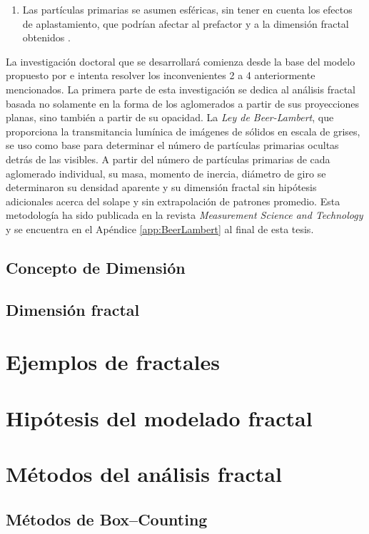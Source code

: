 \begin{enumerate}
	\item Las partículas primarias se asumen esféricas, sin tener en cuenta los efectos de aplastamiento, que podrían afectar al prefactor y a la dimensión fractal obtenidos \cite{ohetal:1997,brasiletal:1999,alzaitoneetal:2009}.
\end{enumerate}

\par La investigación doctoral que se desarrollará comienza desde la base del modelo propuesto por \cite{lapuertaetal:2006} e intenta resolver los inconvenientes 2 a 4 anteriormente mencionados. La primera parte de esta investigación se dedica al análisis fractal  basada no solamente en la forma de los aglomerados a partir de sus proyecciones planas, sino también a partir de su opacidad. La \emph{Ley de Beer-Lambert}, que proporciona la transmitancia lumínica de imágenes de sólidos en escala de grises, se uso como base para determinar el número de partículas primarias ocultas detrás de las visibles. A partir del número de partículas primarias de cada aglomerado individual, su masa, momento de inercia, diámetro de giro se determinaron su densidad aparente y su dimensión fractal sin hipótesis adicionales acerca del solape y sin extrapolación de patrones promedio. Esta metodología ha sido publicada en la revista \textit{Measurement Science and Technology} y se encuentra en el Apéndice \ref{app:BeerLambert} al final de esta tesis.

\subsection{Concepto de Dimensión}
\subsection{Dimensión fractal}
\section{Ejemplos de fractales}\label{sec:EjemplosFractales}
\section{Hipótesis del modelado fractal}\label{sec:HipotesisModeladoFractal}
\section{Métodos del análisis fractal}\label{sec:MetodosAnalisisFractal}
\subsection{Métodos de Box--Counting}
